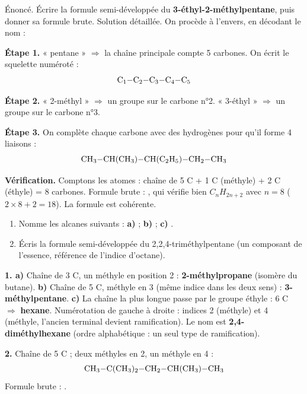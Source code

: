 \documentclass[11pt]{article}
\begin{document}
\begin{exoresolu}
Énoncé. Écrire la formule semi-développée du \textbf{3-éthyl-2-méthylpentane}, puis donner sa formule brute.
\tcblower
Solution détaillée. On procède à l'envers, en décodant le nom :

\textbf{Étape 1.} « pentane » $\Rightarrow$ la chaîne principale compte 5 carbones. On écrit le squelette numéroté :
\[ \ce{C1-C2-C3-C4-C5} \]

\textbf{Étape 2.} « 2-méthyl » $\Rightarrow$ un groupe  sur le carbone n°2. « 3-éthyl » $\Rightarrow$ un groupe  sur le carbone n°3.

\textbf{Étape 3.} On complète chaque carbone avec des hydrogènes pour qu'il forme 4 liaisons :
\[ \ce{CH3-CH(CH3)-CH(C2H5)-CH2-CH3} \]

\textbf{Vérification.} Comptons les atomes : chaîne de 5 C + 1 C (méthyle) + 2 C (éthyle) = 8 carbones. Formule brute : , qui vérifie bien $C_nH_{2n+2}$ avec $n = 8$ ($2 \times 8 + 2 = 18$). La formule est cohérente.
\end{exoresolu}

\begin{exercice}
\begin{enumerate}
\item Nomme les alcanes suivants : \textbf{a)}  ; \textbf{b)}  ; \textbf{c)} .
\item Écris la formule semi-développée du 2,2,4-triméthylpentane (un composant de l'essence, référence de l'indice d'octane).
\end{enumerate}
\end{exercice}

\begin{corrige}
\textbf{1. a)} Chaîne de 3 C, un méthyle en position 2 : \textbf{2-méthylpropane} (isomère du butane).
\textbf{b)} Chaîne de 5 C, méthyle en 3 (même indice dans les deux sens) : \textbf{3-méthylpentane}.
\textbf{c)} La chaîne la plus longue passe par le groupe éthyle : 6 C $\Rightarrow$ \textbf{hexane}. Numérotation de gauche à droite : indices 2 (méthyle) et 4 (méthyle, l'ancien  terminal devient ramification). Le nom est \textbf{2,4-diméthylhexane} (ordre alphabétique : un seul type de ramification).

\textbf{2.} Chaîne de 5 C ; deux méthyles en 2, un méthyle en 4 :
\[ \ce{CH3-C(CH3)2-CH2-CH(CH3)-CH3} \]
Formule brute : .
\end{corrige}
\end{document}
